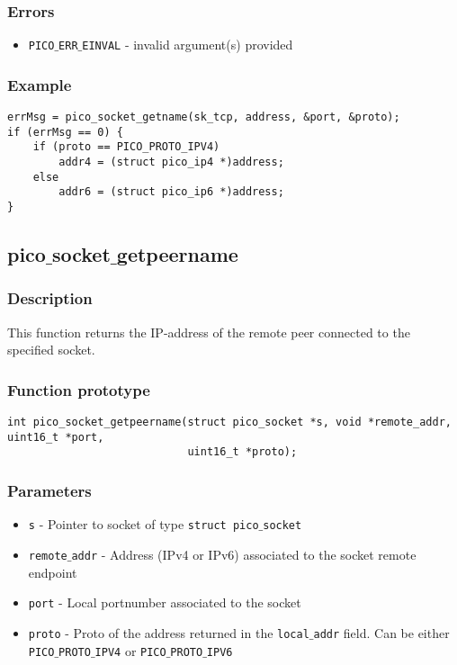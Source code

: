 \subsubsection*{Errors}
\begin{itemize}[noitemsep]
\item \texttt{PICO$\_$ERR$\_$EINVAL} - invalid argument(s) provided
\end{itemize}

\subsubsection*{Example}
\begin{verbatim}
errMsg = pico_socket_getname(sk_tcp, address, &port, &proto);
if (errMsg == 0) {
    if (proto == PICO_PROTO_IPV4)
        addr4 = (struct pico_ip4 *)address;
    else
        addr6 = (struct pico_ip6 *)address;
}
\end{verbatim}

\subsection{pico$\_$socket$\_$getpeername}

\subsubsection*{Description}
This function returns the IP-address of the remote peer connected to the specified socket.

\subsubsection*{Function prototype}
\begin{verbatim}
int pico_socket_getpeername(struct pico_socket *s, void *remote_addr, uint16_t *port, 
                            uint16_t *proto);
\end{verbatim}


\subsubsection*{Parameters}
\begin{itemize}[noitemsep]
\item \texttt{s} - Pointer to socket of type \texttt{struct pico$\_$socket}
\item \texttt{remote$\_$addr} - Address (IPv4 or IPv6) associated to the socket remote endpoint
\item \texttt{port} - Local portnumber associated to the socket
\item \texttt{proto} - Proto of the address returned in the \texttt{local$\_$addr} field. Can be either \texttt{PICO$\_$PROTO$\_$IPV4} or \texttt{PICO$\_$PROTO$\_$IPV6}
\end{itemize}

